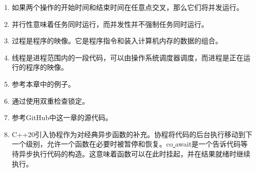 \begin{enumerate}
	\item 如果两个操作的开始时间和结束时间在任意点交叉，那么它们将并发运行。
	\item 并行性意味着任务同时运行，而并发性并不强制任务同时运行。
	\item 过程是程序的映像。它是程序指令和装入计算机内存的数据的组合。
	\item 线程是进程范围内的一段代码，可以由操作系统调度器调度，而进程是正在运行的程序的映像。
	\item 参考本章中的例子。
	\item 通过使用双重检查锁定。
	\item 参考GitHub中这一章的源代码。
	\item C++20引入协程作为对经典异步函数的补充。协程将代码的后台执行移动到下一个级别，允许一个函数在必要时被暂停和恢复。co\underline{ }await是一个告诉代码等待异步执行代码的构造。这意味着函数可以在此时挂起，并在结果就绪时继续执行。
\end{enumerate}












